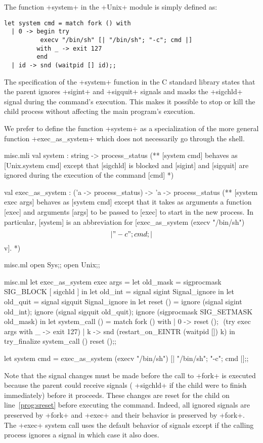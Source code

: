 \begin{example}
The function \ml+system+ in the \ml+Unix+ module is simply defined as: 
%
\begin{lstlisting}
let system cmd = match fork () with
  | 0 -> begin try
          execv "/bin/sh" [| "/bin/sh"; "-c"; cmd |]
         with _ -> exit 127 
         end
  | id -> snd (waitpid [] id);;
\end{lstlisting}
% 
The specification of the \ml+system+ function in the C standard
library states that the parent ignores \ml+sigint+ and
\ml+sigquit+ signals and masks the \ml+sigchld+ signal during the
command's execution.  This makes it possible to stop or kill the child
process without affecting the main program's execution.

We prefer to define the function \ml+system+ as a specialization of the
more general function \ml+exec_as_system+ which does not necessarily 
go through the shell.
%
\begin{codefile}{misc.mli}
val system : string -> process_status
(** [system cmd] behaves as [Unix.system cmd] except that [sigchld] is
blocked and [sigint] and [sigquit] are ignored during the execution 
of the command [cmd] *)

val exec_as_system : ('a -> process_status) -> 'a -> process_status
(** [system exec args] behaves as [system cmd] except that it takes as
arguments a function [exec] and arguments [args] to be passed to [exec]
to start in the new process. In particular, [system] is an abbreviation for 
[exec_as_system (execv "/bin/sh") \[|"-c"; cmd; |\] v]. *)
\end{codefile}
%
\begin{codefile}{misc.ml}
open Sys;;
open Unix;;
\end{codefile}
%
\begin{listingcodefile}[style=numbers]{misc.ml}
let exec_as_system exec args = 
  let old_mask = sigprocmask SIG_BLOCK [ sigchld ] in 
  let old_int = signal sigint Signal_ignore in 
  let old_quit = signal sigquit Signal_ignore in 
  let reset () =
    ignore (signal sigint old_int); 
    ignore (signal sigquit old_quit);
    ignore (sigprocmask SIG_SETMASK old_mask) in
  let system_call () = match fork () with
    | 0 -> 
        reset (); $\label{prog:sreset}$
        (try exec args with _ -> exit 127)
    | k -> 
        snd (restart_on_EINTR (waitpid []) k) in
  try_finalize system_call () reset ();; $\label{prog:stry}$

let system cmd = 
  exec_as_system (execv "/bin/sh") [| "/bin/sh"; "-c"; cmd |];;
\end{listingcodefile}
%
Note that the signal changes must be made before the call
to \ml+fork+ is executed because the parent could receive signals
(\eg{} \ml+sigchld+ if the child were to finish immediately) before it
proceeds. These changes are reset for the child on line~\ref{prog:sreset}
before executing the command. Indeed, all ignored signals
are preserved by \ml+fork+ and \ml+exec+ and their behavior is
preserved by \ml+fork+.  The \ml+exec+ system call uses the
default behavior of signals except if the calling process ignores a
signal in which case it also does. 


\end{example}
